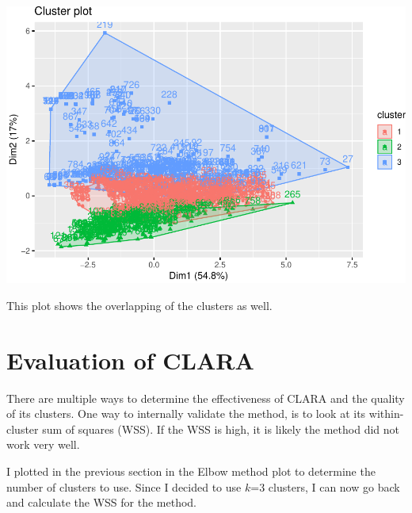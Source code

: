 \documentclass[12pt,twoside]{amherstthesis}
\begin{document}
  \begin{center}\includegraphics{Comps_Proj_files/figure-latex/unnamed-chunk-10-1} \end{center}
  
  This plot shows the overlapping of the clusters as well.
  
  \section{Evaluation of CLARA}\label{evaluation-of-clara}
  
  There are multiple ways to determine the effectiveness of CLARA and the
  quality of its clusters. One way to internally validate the method, is
  to look at its within-cluster sum of squares (WSS). If the WSS is high,
  it is likely the method did not work very well.
  
  I plotted in the previous section in the Elbow method plot to determine
  the number of clusters to use. Since I decided to use \(k\)=3 clusters,
  I can now go back and calculate the WSS for the method.
  
  \begin{Shaded}
  \begin{Highlighting}[]
   \NormalTok{) }\OperatorTok{+}
  \StringTok{    }\NormalTok{(} \NormalTok{, } \NormalTok{)}\OperatorTok{+}
  \StringTok{  }\NormalTok{(} \NormalTok{)}
  \end{Highlighting}
  \end{Shaded}
  
\end{document}
